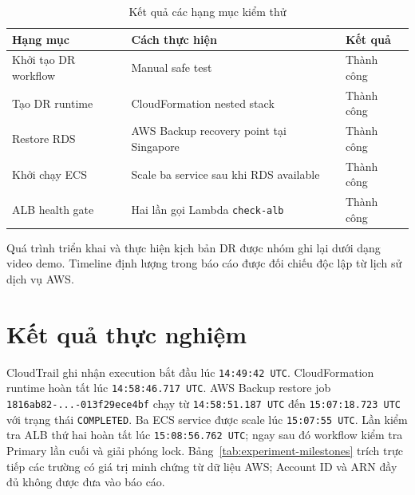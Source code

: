 \begin{table}[H]
\centering
\caption{Kết quả các hạng mục kiểm thử}
\label{tab:test-status}
\begin{tabularx}{\textwidth}{@{}p{4cm}p{5cm}X@{}}
\toprule
\textbf{Hạng mục} & \textbf{Cách thực hiện} & \textbf{Kết quả} \\
\midrule
Khởi tạo DR workflow & Manual safe test & Thành công \\
Tạo DR runtime & CloudFormation nested stack & Thành công \\
Restore RDS & AWS Backup recovery point tại Singapore & Thành công \\
Khởi chạy ECS & Scale ba service sau khi RDS available & Thành công \\
ALB health gate & Hai lần gọi Lambda \texttt{check-alb} & Thành công \\
\bottomrule
\end{tabularx}
\end{table}

Quá trình triển khai và thực hiện kịch bản DR được nhóm ghi lại dưới dạng video demo. Timeline định lượng trong báo cáo được đối chiếu độc lập từ lịch sử dịch vụ AWS.

\section{Kết quả thực nghiệm}

CloudTrail ghi nhận execution bắt đầu lúc \texttt{14:49:42 UTC}. CloudFormation runtime hoàn tất lúc \texttt{14:58:46.717 UTC}. AWS Backup restore job \texttt{1816ab82-...-013f29ece4bf} chạy từ \texttt{14:58:51.187 UTC} đến \texttt{15:07:18.723 UTC} với trạng thái \texttt{COMPLETED}. Ba ECS service được scale lúc \texttt{15:07:55 UTC}. Lần kiểm tra ALB thứ hai hoàn tất lúc \texttt{15:08:56.762 UTC}; ngay sau đó workflow kiểm tra Primary lần cuối và giải phóng lock. Bảng~\ref{tab:experiment-milestones} trích trực tiếp các trường có giá trị minh chứng từ dữ liệu AWS; Account ID và ARN đầy đủ không được đưa vào báo cáo.

